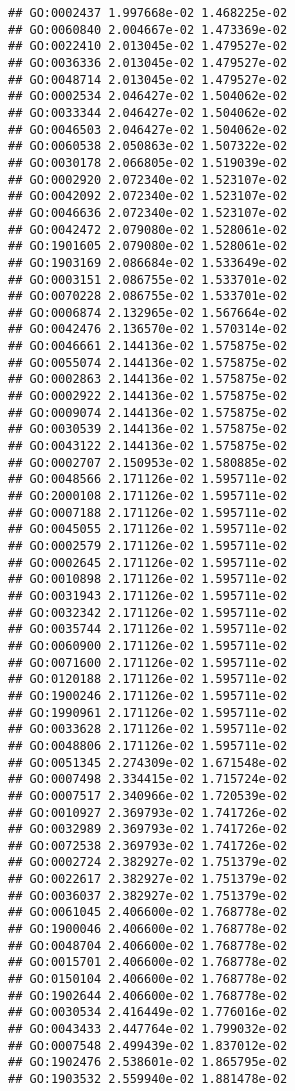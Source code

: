\documentclass[
]{article}
\begin{document}
\begin{verbatim}
## GO:0002437 1.997668e-02 1.468225e-02
## GO:0060840 2.004667e-02 1.473369e-02
## GO:0022410 2.013045e-02 1.479527e-02
## GO:0036336 2.013045e-02 1.479527e-02
## GO:0048714 2.013045e-02 1.479527e-02
## GO:0002534 2.046427e-02 1.504062e-02
## GO:0033344 2.046427e-02 1.504062e-02
## GO:0046503 2.046427e-02 1.504062e-02
## GO:0060538 2.050863e-02 1.507322e-02
## GO:0030178 2.066805e-02 1.519039e-02
## GO:0002920 2.072340e-02 1.523107e-02
## GO:0042092 2.072340e-02 1.523107e-02
## GO:0046636 2.072340e-02 1.523107e-02
## GO:0042472 2.079080e-02 1.528061e-02
## GO:1901605 2.079080e-02 1.528061e-02
## GO:1903169 2.086684e-02 1.533649e-02
## GO:0003151 2.086755e-02 1.533701e-02
## GO:0070228 2.086755e-02 1.533701e-02
## GO:0006874 2.132965e-02 1.567664e-02
## GO:0042476 2.136570e-02 1.570314e-02
## GO:0046661 2.144136e-02 1.575875e-02
## GO:0055074 2.144136e-02 1.575875e-02
## GO:0002863 2.144136e-02 1.575875e-02
## GO:0002922 2.144136e-02 1.575875e-02
## GO:0009074 2.144136e-02 1.575875e-02
## GO:0030539 2.144136e-02 1.575875e-02
## GO:0043122 2.144136e-02 1.575875e-02
## GO:0002707 2.150953e-02 1.580885e-02
## GO:0048566 2.171126e-02 1.595711e-02
## GO:2000108 2.171126e-02 1.595711e-02
## GO:0007188 2.171126e-02 1.595711e-02
## GO:0045055 2.171126e-02 1.595711e-02
## GO:0002579 2.171126e-02 1.595711e-02
## GO:0002645 2.171126e-02 1.595711e-02
## GO:0010898 2.171126e-02 1.595711e-02
## GO:0031943 2.171126e-02 1.595711e-02
## GO:0032342 2.171126e-02 1.595711e-02
## GO:0035744 2.171126e-02 1.595711e-02
## GO:0060900 2.171126e-02 1.595711e-02
## GO:0071600 2.171126e-02 1.595711e-02
## GO:0120188 2.171126e-02 1.595711e-02
## GO:1900246 2.171126e-02 1.595711e-02
## GO:1990961 2.171126e-02 1.595711e-02
## GO:0033628 2.171126e-02 1.595711e-02
## GO:0048806 2.171126e-02 1.595711e-02
## GO:0051345 2.274309e-02 1.671548e-02
## GO:0007498 2.334415e-02 1.715724e-02
## GO:0007517 2.340966e-02 1.720539e-02
## GO:0010927 2.369793e-02 1.741726e-02
## GO:0032989 2.369793e-02 1.741726e-02
## GO:0072538 2.369793e-02 1.741726e-02
## GO:0002724 2.382927e-02 1.751379e-02
## GO:0022617 2.382927e-02 1.751379e-02
## GO:0036037 2.382927e-02 1.751379e-02
## GO:0061045 2.406600e-02 1.768778e-02
## GO:1900046 2.406600e-02 1.768778e-02
## GO:0048704 2.406600e-02 1.768778e-02
## GO:0015701 2.406600e-02 1.768778e-02
## GO:0150104 2.406600e-02 1.768778e-02
## GO:1902644 2.406600e-02 1.768778e-02
## GO:0030534 2.416449e-02 1.776016e-02
## GO:0043433 2.447764e-02 1.799032e-02
## GO:0007548 2.499439e-02 1.837012e-02
## GO:1902476 2.538601e-02 1.865795e-02
## GO:1903532 2.559940e-02 1.881478e-02

\end{verbatim}
\end{document}
